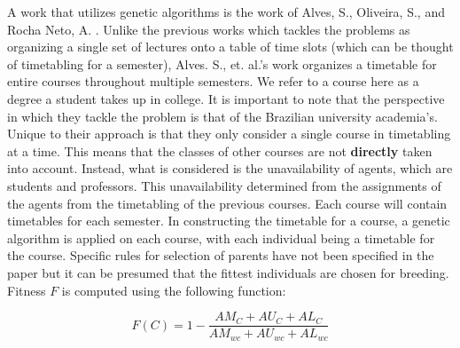A work that utilizes genetic algorithms is the work of Alves, S., Oliveira, S., and Rocha Neto, A. \cite{alves-novel-recursive}. Unlike the previous works which tackles the problems as organizing a single set of lectures onto a table of time slots (which can be thought of timetabling for a semester), Alves. S., et. al.'s work organizes a timetable for entire courses throughout multiple semesters. We refer to a course here as a degree a student takes up in college. It is important to note that the perspective in which they tackle the problem is that of the Brazilian university academia's. Unique to their approach is that they only consider a single course in timetabling at a time. This means that the classes of other courses are not \textbf{directly} taken into account. Instead, what is considered is the unavailability of agents, which are students and professors. This unavailability determined from the assignments of the agents from the timetabling of the previous courses. Each course will contain timetables for each semester. In constructing the timetable for a course, a genetic algorithm is applied on each course, with each individual being a timetable for the course. Specific rules for selection of parents have not been specified in the paper but it can be presumed that the fittest individuals are chosen for breeding. Fitness $F$ is computed using the following function:

\[
	F(C) = 1 - \frac{AM_{C} + AU_{C} + AL_{C}}{AM_{wc} + AU_{wc} + AL_{wc}}
\]


